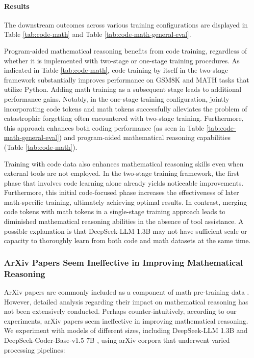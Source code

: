 \begin{itemize}[topsep=0pt]
\begin{itemize}[topsep=0pt]
\paragraph{Results}
The downstream outcomes across various training configurations are displayed in Table \ref{tab:code-math} and Table \ref{tab:code-math-general-eval}.

Program-aided mathematical reasoning benefits from code training, regardless of whether it is implemented with two-stage or one-stage training procedures. As indicated in Table \ref{tab:code-math}, code training by itself in the two-stage framework substantially improves performance on GSM8K and MATH tasks that utilize Python. Adding math training as a subsequent stage leads to additional performance gains. Notably, in the one-stage training configuration, jointly incorporating code tokens and math tokens successfully alleviates the problem of catastrophic forgetting often encountered with two-stage training. Furthermore, this approach enhances both coding performance (as seen in Table \ref{tab:code-math-general-eval}) and program-aided mathematical reasoning capabilities (Table \ref{tab:code-math}).

Training with code data also enhances mathematical reasoning skills even when external tools are not employed. In the two-stage training framework, the first phase that involves code learning alone already yields noticeable improvements. Furthermore, this initial code-focused phase increases the effectiveness of later math-specific training, ultimately achieving optimal results. In contrast, merging code tokens with math tokens in a single-stage training approach leads to diminished mathematical reasoning abilities in the absence of tool assistance. A possible explanation is that DeepSeek-LLM 1.3B may not have sufficient scale or capacity to thoroughly learn from both code and math datasets at the same time.

\subsubsection{ArXiv Papers Seem Ineffective in Improving Mathematical Reasoning}

ArXiv papers are commonly included as a component of math pre-training data \citep{minerva,gpt-f,llemma,mathpile}. However, detailed analysis regarding their impact on mathematical reasoning has not been extensively conducted. Perhaps counter-intuitively, according to our experiments, arXiv papers seem ineffective in improving mathematical reasoning. We experiment with models of different sizes, including DeepSeek-LLM 1.3B and DeepSeek-Coder-Base-v1.5 7B \citep{deepseek-coder}, using arXiv corpora that underwent varied processing pipelines:


\end{itemize}
\end{itemize}

